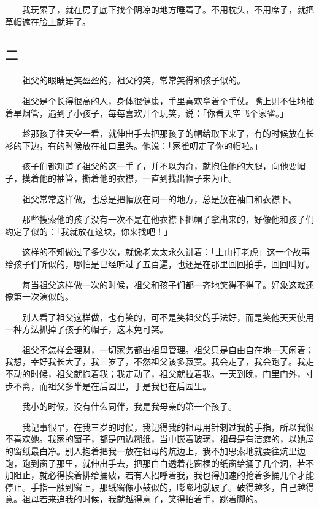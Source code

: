 \documentclass[UTF8]{ctexart}
\begin{document}
　　我玩累了，就在房子底下找个阴凉的地方睡着了。不用枕头，不用席子，就把草帽遮在脸上就睡了。

\subsection{二}

　　祖父的眼睛是笑盈盈的，祖父的笑，常常笑得和孩子似的。

　　祖父是个长得很高的人，身体很健康，手里喜欢拿着个手仗。嘴上则不住地抽着旱烟管，遇到了小孩子，每每喜欢开个玩笑，说：「你看天空飞个家雀。」

　　趁那孩子往天空一看，就伸出手去把那孩子的帽给取下来了，有的时候放在长衫的下边，有的时候放在袖口里头。他说：「家雀叨走了你的帽啦。」

　　孩子们都知道了祖父的这一手了，并不以为奇，就抱住他的大腿，向他要帽子，摸着他的袖管，撕着他的衣襟，一直到找出帽子来为止。

　　祖父常常这样做，也总是把帽放在同一的地方，总是放在袖口和衣襟下。

　　那些搜索他的孩子没有一次不是在他衣襟下把帽子拿出来的，好像他和孩子们约定了似的：「我就放在这块，你来找吧！」

　　这样的不知做过了多少次，就像老太太永久讲着：「上山打老虎」这一个故事给孩子们听似的，哪怕是已经听过了五百遍，也还是在那里回回拍手，回回叫好。

　　每当祖父这样做一次的时候，祖父和孩子们都一齐地笑得不得了。好象这戏还像第一次演似的。

　　别人看了祖父这样做，也有笑的，可不是笑祖父的手法好，而是笑他天天使用一种方法抓掉了孩子的帽子，这未免可笑。

　　祖父不怎样会理财，一切家务都由祖母管理。祖父只是自由自在地一天闲着；我想，幸好我长大了，我三岁了，不然祖父该多寂寞。我会走了，我会跑了。我走不动的时候，祖父就抱着我；我走动了，祖父就拉着我。一天到晚，门里门外，寸步不离，而祖父多半是在后园里，于是我也在后园里。

　　我小的时候，没有什么同伴，我是我母亲的第一个孩子。

　　我记事很早，在我三岁的时候，我记得我的祖母用针刺过我的手指，所以我很不喜欢她。我家的窗子，都是四边糊纸，当中嵌着玻璃，祖母是有洁癖的，以她屋的窗纸最白净。别人抱着把我一放在祖母的炕边上，我不加思索地就要往炕里边跑，跑到窗子那里，就伸出手去，把那白白透着花窗棂的纸窗给捅了几个洞，若不加阻止，就必得挨着排给捅破，若有人招呼着我，我也得加速的抢着多捅几个才能停止。手指一触到窗上，那纸窗像小鼓似的，嘭嘭地就破了。破得越多，自己越得意。祖母若来追我的时候，我就越得意了，笑得拍着手，跳着脚的。
\end{document}
